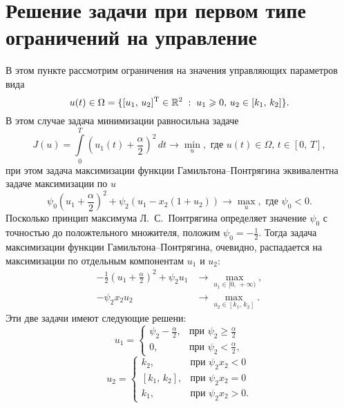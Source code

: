 \section{Решение задачи при первом типе ограничений на управление}

В этом пункте рассмотрим ограничения на значения управляющих параметров вида
$$
        u(t) \in \Omega = \{[u_1,\,u_2]^{\mathrm{T}}\in\mathbb{R}^2\;:\; u_1 \geqslant 0,\, u_2\in[k_1,\,k_2]\}.
$$
В этом случае задача минимизации равносильна задаче
$$
        J(u) = \int\limits_0^T\left(u_1(t) + \frac{\alpha}{2}\right)^2\,dt \to \min\limits_u, \mbox{ где $u(t) \in \Omega$, $t \in [0,\,T]$},
$$
при этом задача максимизации функции Гамильтона--Понтрягина эквивалентна задаче максимизации по $u$
$$
        \psi_0 \left(u_1 + \frac{\alpha}{2}\right)^2 + \psi_2(u_1 - x_2(1 + u_2)) \to \max\limits_u, \mbox{ где $\psi_0 < 0.$}
$$
Посколько принцип максимума Л.~С.~Понтрягина определяет значение $\psi_0$ с точностью до положтельного множителя, положим $\psi_0 = -\frac{1}{2}$. Тогда задача максимизации функции Гамильтона--Понтрягина, очевидно, распадается на максимизации по отдельным компонентам $u_1$ и $u_2$:
$$
        \begin{aligned}
        -\frac{1}{2}\left( u_1 + \frac{\alpha}{2}\right)^2 + \psi_2u_1 & \to \max\limits_{u_1\in[0,\,+\infty)}, \\
        -\psi_2x_2u_2 &\to \max\limits_{u_2 \in [k_1,\,k_2]}.
        \end{aligned}
$$
Эти две задачи имеют следующие решени:
\begin{equation}\label{eq:firstlim_u_1}
        u_1 = 
        \begin{cases}
                \psi_2 - \frac{\alpha}{2}, &\mbox{при $\psi_2 \geqslant \frac{\alpha}{2}$} \\
                0, & \mbox{при $\psi_2 < \frac{\alpha}{2}$},
        \end{cases}
\end{equation}
\begin{equation}\label{eq:firstlim_u_2}
        u_2 = 
        \begin{cases}
                k_2, &\mbox{при $\psi_2x_2<0$} \\
                [k_1,\,k_2], & \mbox{при $\psi_2x_2 = 0$} \\
                k_1, & \mbox{при $\psi_2x_2 > 0$}.
        \end{cases}
\end{equation}

